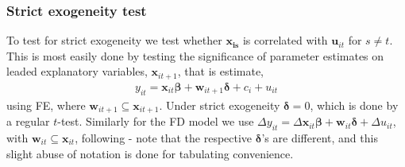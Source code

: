 \subsubsection*{Strict exogeneity test}

To test for strict exogeneity we test whether $\bm{x_{is}}$ is correlated with $\bm{u}_{it}$ for $s \neq t$. This is most easily done by testing the significance of parameter estimates on leaded explanatory variables, $\bm{x}_{it+1}$, that is estimate, 
\begin{align*}
    y_{it} = \bm{x}_{it} \bm{\beta} + \bm{w}_{it+1} \bm{\delta} + c_i + u_{it}
\end{align*} 
using FE, where $\bm{w}_{it+1} \subseteq \bm{x}_{it+1}$. Under strict exogeneity $\bm{\delta} = 0$, which is done by a regular $t$-test. Similarly for the FD model we use $\Delta y_{it} = \Delta \bm{x}_{it} \bm{\beta} + \bm{w}_{it} \bm{\delta} + \Delta u_{it}$, with $\bm{w}_{it} \subseteq \bm{x}_{it}$, following \cite[Chapter~10]{wooldridgeEconometricAnalysisCross2010} - note that the respective $\bm{\delta}$'s are different, and this slight abuse of notation is done for tabulating convenience.

